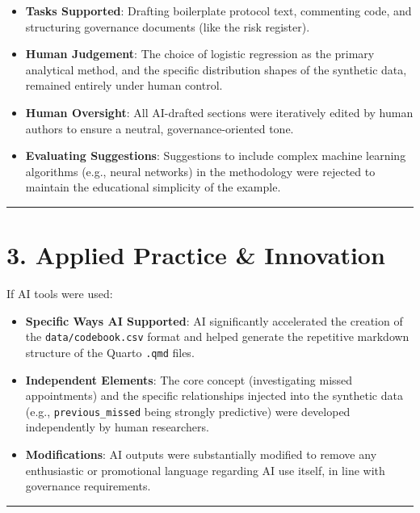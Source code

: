 \documentclass[
]{report}
\providecommand{\tightlist}{%
  \setlength{\itemsep}{0pt}\setlength{\parskip}{0pt}}
\begin{document}
\begin{itemize}
\tightlist
\item
  \textbf{Tasks Supported}: Drafting boilerplate protocol text,
  commenting code, and structuring governance documents (like the risk
  register).
\item
  \textbf{Human Judgement}: The choice of logistic regression as the
  primary analytical method, and the specific distribution shapes of the
  synthetic data, remained entirely under human control.
\item
  \textbf{Human Oversight}: All AI-drafted sections were iteratively
  edited by human authors to ensure a neutral, governance-oriented tone.
\item
  \textbf{Evaluating Suggestions}: Suggestions to include complex
  machine learning algorithms (e.g., neural networks) in the methodology
  were rejected to maintain the educational simplicity of the example.
\end{itemize}

\begin{center}\rule{0.5\linewidth}{0.5pt}\end{center}

\section{3. Applied Practice \&
Innovation}\label{applied-practice-innovation}

If AI tools were used:

\begin{itemize}
\tightlist
\item
  \textbf{Specific Ways AI Supported}: AI significantly accelerated the
  creation of the \texttt{data/codebook.csv} format and helped generate
  the repetitive markdown structure of the Quarto \texttt{.qmd} files.
\item
  \textbf{Independent Elements}: The core concept (investigating missed
  appointments) and the specific relationships injected into the
  synthetic data (e.g., \texttt{previous\_missed} being strongly
  predictive) were developed independently by human researchers.
\item
  \textbf{Modifications}: AI outputs were substantially modified to
  remove any enthusiastic or promotional language regarding AI use
  itself, in line with governance requirements.
\end{itemize}

\begin{center}\rule{0.5\linewidth}{0.5pt}\end{center}
\end{document}
